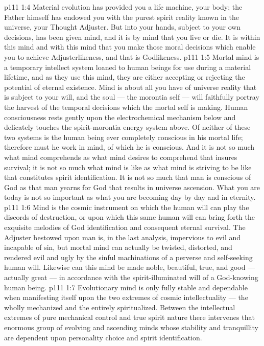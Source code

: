 \vs p111 1:4 \pc Material evolution has provided you a life machine, your body; the Father himself has endowed you with the purest spirit reality known in the universe, your Thought Adjuster. But into your hands, subject to your own decisions, has been given mind, and it is by mind that you live or die. It is within this mind and with this mind that you make those moral decisions which enable you to achieve Adjusterlikeness, and that is Godlikeness.
\vs p111 1:5 Mortal mind is a temporary intellect system loaned to human beings for use during a material lifetime, and as they use this mind, they are either accepting or rejecting the potential of eternal existence. Mind is about all you have of universe reality that is subject to your will, and the soul --- the morontia self --- will faithfully portray the harvest of the temporal decisions which the mortal self is making. Human consciousness rests gently upon the electrochemical mechanism below and delicately touches the spirit\hyp{}morontia energy system above. Of neither of these two systems is the human being ever completely conscious in his mortal life; therefore must he work in mind, of which he is conscious. And it is not so much what mind comprehends as what mind desires to comprehend that insures survival; it is not so much what mind is like as what mind is striving to be like that constitutes spirit identification. It is not so much that man is conscious of God as that man yearns for God that results in universe ascension. What you are today is not so important as what you are becoming day by day and in eternity.
\vs p111 1:6 Mind is the cosmic instrument on which the human will can play the discords of destruction, or upon which this same human will can bring forth the exquisite melodies of God identification and consequent eternal survival. The Adjuster bestowed upon man is, in the last analysis, impervious to evil and incapable of sin, but mortal mind can actually be twisted, distorted, and rendered evil and ugly by the sinful machinations of a perverse and self\hyp{}seeking human will. Likewise can this mind be made noble, beautiful, true, and good --- actually great --- in accordance with the spirit\hyp{}illuminated will of a God\hyp{}knowing human being.
\vs p111 1:7 \pc Evolutionary mind is only fully stable and dependable when manifesting itself upon the two extremes of cosmic intellectuality --- the wholly mechanized and the entirely spiritualized. Between the intellectual extremes of pure mechanical control and true spirit nature there intervenes that enormous group of evolving and ascending minds whose stability and tranquillity are dependent upon personality choice and spirit identification.
